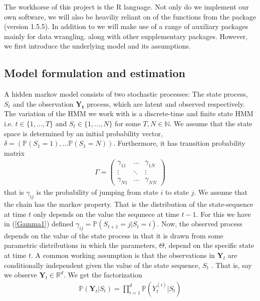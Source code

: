 The workhorse of this project is the R language.\cite{RLang}
Not only do we implement our own software, we will also be heaviliy reliant on of the functions from the package  \cite{momentuHMM} (version 1.5.5). In addition to  we will make use of a range of auxiliary packages mainly for data wrangling.\cite{tidyverse}\cite{Rcpp} along with other supplementary packages.\cite{gridExtra}\cite{microbenchmark}\cite{ggthemes}\cite{ggmap}\cite{mapview} However, we first introduce the underlying model and its assumptions.
\subsection{Model formulation and estimation}
A hidden markov model consists of two stochastic processes: The state process, $S_t$ and the observation $\mathbf{Y_t}$ process, which are latent and observed respectively. The variation of the HMM we work with is a discrete-time and finite state HMM i.e. $t\in\{1,\dots , T\}$ and $S_t\in\{1,\dots , N\}$ for some $T, N\in\mathbb{N}$. We assume that the state space is determined by an initial probability vector, $\delta = \left(\mathbb{P}(S_1 = 1),\dots \mathbb{P}(S_1 = N)\right)$. Furthermore, it has transition probability matrix
\begin{align}
    \Gamma = \begin{pmatrix}
        \gamma_{11} & \dots &  \gamma_{1N} \\
        \vdots & \ddots & \vdots \\
        \gamma_{N1} & \dots & \gamma_{NN}
    \end{pmatrix} \label{Gamma1}
\end{align}
that is $\gamma_{ij}$ is the probability of jumping from state $i$ to state $j$. We assume that the chain has the markov property. That is the distribution of the state-sequence at time $t$ only depends on the value the sequnece at time $t-1$. For this we have in (\ref{Gamma1}) defined $\gamma_{ij} = \mathbb{P}\left(S_{t+1} = j | S_t = i\right)$. Now, the observed process depends on the value of the state process in that it is drawn from some parametric distributions in which the parameters, $\Theta$, depend on the specific state at time $t$.
A common working assumption is that the observations in $\mathbf{Y}_t$ are conditionally independent given the value of the state sequence, $S_t$ \cite{UncoveringEcologicalState}. That is, say we observe $\mathbf{Y}_t\in\mathbb{R}^d$. We get the factorization
\begin{align}\mathbb{P}(\mathbf{Y}_t | S_t) = \prod_{i = 1}^{d} \mathbb{P}(Y_t^{(i)} | S_t)
\end{align}
